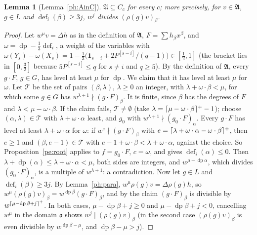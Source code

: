 \documentclass[10pt]{amsart}
\newtheorem{lemma}[theorem]{Lemma}
\theoremstyle{definition}
\theoremstyle{remark}
\providecommand{\pao}{\mathfrak o}
\providecommand{\phA}{\mathfrak A}
\providecommand{\phdef}{\operatorname{def}}
\providecommand{\phdep}{\operatorname{dp}}
\begin{document}
\begin{lemma}[Lemma~\ref{ph:AinC}]\label{pe:AinC}
$\phA\subseteq C_c$ for every $c$; more precisely, for $v\in\phA$, $g\in L$ and
$\phdef_i(\beta)\ge3j$, $w^j$ divides $(\rho(g)v)_\beta$.
\end{lemma}
\begin{proof}
Let $w^\mu v=\Delta h$ as in the definition of
$\phA$, $F=\sum h_\beta x^\beta$, and $\omega=\phdep-\tfrac13\phdef_i$, a weight of the variables
with $\omega(Y_s)-\omega(X_s)=1-\tfrac13\bigl(\mathbf 1_{s=i}+2P^{[s-i]}/(q-1)\bigr)\in[\tfrac12,1]$
(the bracket lies in $[0,\tfrac32]$ because $5P^{[s-i]}\le q$ for $s\ne i$ and $q\ge5$). By the
definition of $\phA$, every $g\cdot F$, $g\in G$, has level at least $\mu$ for $\phdep$. We claim
that it has level at least $\mu$ for $\omega$. Let $\mathcal T$ be the set of pairs
$(\beta,\lambda)$, $\lambda\ge0$ an integer, with $\lambda+\omega\cdot\beta<\mu$, for which some
$g\in G$ has $w^{\lambda+1}\nmid(g\cdot F)_\beta$. It is finite, since $\beta$ has the degrees of
$F$ and $\lambda<\mu-\omega\cdot\beta$. If the claim fails, $\mathcal T\ne\emptyset$ (take
$\lambda=\lceil \mu-\omega\cdot\beta\rceil^{+}-1$); choose $(\alpha,\lambda)\in\mathcal T$ with
$\lambda+\omega\cdot\alpha$ least, and $g_0$ with $w^{\lambda+1}\nmid(g_0\cdot F)_\alpha$. Every
$g\cdot F$ has level at least $\lambda+\omega\cdot\alpha$ for $\omega$: if $w^e\nmid(g\cdot
F)_\beta$ with $e=\lceil \lambda+\omega\cdot\alpha-\omega\cdot\beta\rceil^{+}$, then $e\ge1$ and
$(\beta,e-1)\in\mathcal T$ with $e-1+\omega\cdot\beta<\lambda+\omega\cdot\alpha$, against the
choice. So Proposition~\ref{pe:root} applies to $f=g_0\cdot F$, $c=\omega$, and gives
$\phdef_i(\alpha)\le0$. Then $\lambda+\phdep(\alpha)\le\lambda+\omega\cdot\alpha<\mu$, both sides
are integers, and $w^{\mu-\phdep\alpha}$, which divides $(g_0\cdot F)_\alpha$, is a multiple of
$w^{\lambda+1}$: a contradiction. Now let $g\in L$ and $\phdef_i(\beta)\ge3j$. By
Lemma~\ref{ph:para}, $w^\mu\rho(g)v=\Delta\rho(g)h$, so $w^\mu(\rho(g)v)_\beta=w^{\phdep\beta}
(g\cdot F)_\beta$, and by the claim $(g\cdot F)_\beta$ is divisible by $w^{\pecl{\mu-\phdep\beta
+j}}$. In both cases, $\mu-\phdep\beta+j\ge0$ and $\mu-\phdep\beta+j<0$, cancelling $w^\mu$ in the
domain $\pao$ shows $w^j\mid(\rho(g)v)_\beta$ (in the second case $(\rho(g)v)_\beta$ is even
divisible by $w^{\phdep\beta-\mu}$, and $\phdep\beta-\mu>j$).
\end{proof}
\end{document}
